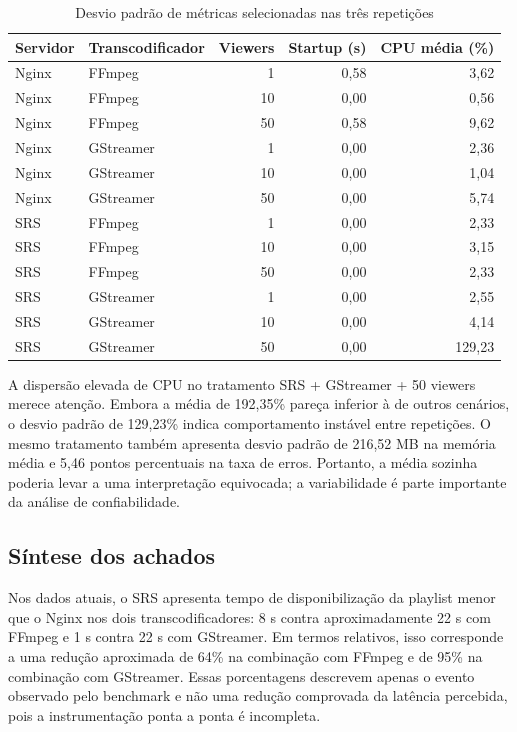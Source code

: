 \begin{table}[H]
\centering
\scriptsize
\caption{Desvio padrão de métricas selecionadas nas três repetições}
\begin{tabular}{@{}llrrr@{}}
\toprule
Servidor & Transcodificador & Viewers & Startup (s) & CPU média (\%) \\
\midrule
Nginx & FFmpeg & 1 & 0,58 & 3,62 \\
Nginx & FFmpeg & 10 & 0,00 & 0,56 \\
Nginx & FFmpeg & 50 & 0,58 & 9,62 \\
Nginx & GStreamer & 1 & 0,00 & 2,36 \\
Nginx & GStreamer & 10 & 0,00 & 1,04 \\
Nginx & GStreamer & 50 & 0,00 & 5,74 \\
SRS & FFmpeg & 1 & 0,00 & 2,33 \\
SRS & FFmpeg & 10 & 0,00 & 3,15 \\
SRS & FFmpeg & 50 & 0,00 & 2,33 \\
SRS & GStreamer & 1 & 0,00 & 2,55 \\
SRS & GStreamer & 10 & 0,00 & 4,14 \\
SRS & GStreamer & 50 & 0,00 & 129,23 \\
\bottomrule
\end{tabular}
\end{table}

A dispersão elevada de CPU no tratamento SRS + GStreamer + 50 viewers merece atenção. Embora a média de 192,35\% pareça inferior à de outros cenários, o desvio padrão de 129,23\% indica comportamento instável entre repetições. O mesmo tratamento também apresenta desvio padrão de 216,52 MB na memória média e 5,46 pontos percentuais na taxa de erros. Portanto, a média sozinha poderia levar a uma interpretação equivocada; a variabilidade é parte importante da análise de confiabilidade.

\subsection{Síntese dos achados}

Nos dados atuais, o SRS apresenta tempo de disponibilização da playlist menor que o Nginx nos dois transcodificadores: 8 s contra aproximadamente 22 s com FFmpeg e 1 s contra 22 s com GStreamer. Em termos relativos, isso corresponde a uma redução aproximada de 64\% na combinação com FFmpeg e de 95\% na combinação com GStreamer. Essas porcentagens descrevem apenas o evento observado pelo benchmark e não uma redução comprovada da latência percebida, pois a instrumentação ponta a ponta é incompleta.


